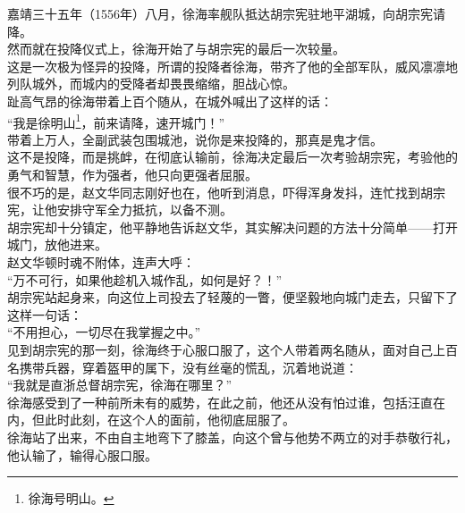 \begin{multicols}{\theparacolNo}
嘉靖三十五年（1556年）八月，徐海率舰队抵达胡宗宪驻地平湖城，向胡宗宪请降。\\

然而就在投降仪式上，徐海开始了与胡宗宪的最后一次较量。\\

这是一次极为怪异的投降，所谓的投降者徐海，带齐了他的全部军队，威风凛凛地列队城外，而城内的受降者却畏畏缩缩，胆战心惊。\\

趾高气昂的徐海带着上百个随从，在城外喊出了这样的话：\\

“我是徐明山\footnote{徐海号明山。}，前来请降，速开城门！”\\

带着上万人，全副武装包围城池，说你是来投降的，那真是鬼才信。\\

这不是投降，而是挑衅，在彻底认输前，徐海决定最后一次考验胡宗宪，考验他的勇气和智慧，作为强者，他只向更强者屈服。\\

很不巧的是，赵文华同志刚好也在，他听到消息，吓得浑身发抖，连忙找到胡宗宪，让他安排守军全力抵抗，以备不测。\\

胡宗宪却十分镇定，他平静地告诉赵文华，其实解决问题的方法十分简单——打开城门，放他进来。\\

赵文华顿时魂不附体，连声大呼：\\

“万不可行，如果他趁机入城作乱，如何是好？！”\\

胡宗宪站起身来，向这位上司投去了轻蔑的一瞥，便坚毅地向城门走去，只留下了这样一句话：\\

“不用担心，一切尽在我掌握之中。”\\

见到胡宗宪的那一刻，徐海终于心服口服了，这个人带着两名随从，面对自己上百名携带兵器，穿着盔甲的属下，没有丝毫的慌乱，沉着地说道：\\

“我就是直浙总督胡宗宪，徐海在哪里？”\\

徐海感受到了一种前所未有的威势，在此之前，他还从没有怕过谁，包括汪直在内，但此时此刻，在这个人的面前，他彻底屈服了。\\

徐海站了出来，不由自主地弯下了膝盖，向这个曾与他势不两立的对手恭敬行礼，他认输了，输得心服口服。\\


\end{multicols}
